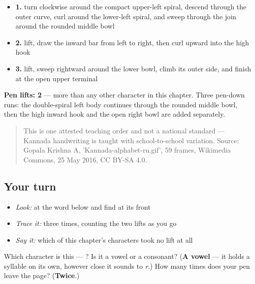 \begin{itemize}
\raggedright
  \item \textbf{1.} turn clockwise around the compact upper-left spiral, descend through the outer curve, curl around the lower-left spiral, and sweep through the join around the rounded middle bowl
  \item \textbf{2.} lift, draw the inward bar from left to right, then curl upward into the high hook
  \item \textbf{3.} lift, sweep rightward around the lower bowl, climb its outer side, and finish at the open upper terminal
\end{itemize}

\textbf{Pen lifts: 2} — more than any other character in this chapter. Three pen-down runs: the double-spiral left body continues through the rounded middle bowl, then the high inward hook and the open right bowl are added separately.

\begin{quote}
This is one attested teaching order and not a national standard — Kannada handwriting is taught with school-to-school variation. Source: Gopala Krishna A, 'Kannada-alphabet-ru.gif', 59 frames, Wikimedia Commons, 25 May 2016, CC BY-SA 4.0.
\end{quote}

\subsection*{Your turn}
\begin{itemize}
\raggedright
  \item \emph{Look:} at the word below and find  at its front
\end{itemize}

\begin{quote}
\end{quote}

\begin{itemize}
\raggedright
  \item \emph{Trace it:}  three times, counting the two lifts as you go
  \item \emph{Say it:} which of this chapter's characters took no lift at all
\end{itemize}

\begin{tcolorbox}[breakable,colback=teal!4,colframe=teal!35!black,title={Before you move on}]
Which character is this — ? Is it a vowel or a consonant? (\textbf{A vowel} — it holds a syllable on its own, however close it sounds to \emph{r}.) How many times does your pen leave the page? (\textbf{Twice}.)
\end{tcolorbox}
